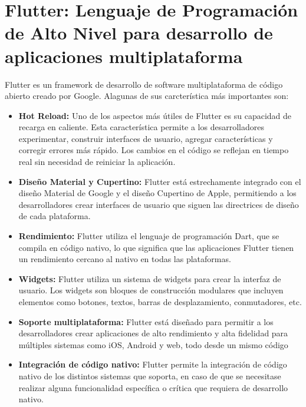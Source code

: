 \section{Flutter: Lenguaje de Programación de Alto Nivel para desarrollo de aplicaciones multiplataforma}
Flutter es un framework de desarrollo de software multiplataforma de código abierto creado por Google. Alagunas de sus carcterística más importantes son:
\begin{itemize}
    \item \textbf{Hot Reload:} Uno de los aspectos más útiles de Flutter es su capacidad de recarga en caliente. Esta característica permite a los desarrolladores experimentar, construir interfaces de usuario, agregar características y corregir errores más rápido. Los cambios en el código se reflejan en tiempo real sin necesidad de reiniciar la aplicación. 
    \item \textbf{Diseño Material y Cupertino:} Flutter está estrechamente integrado con el diseño Material de Google y el diseño Cupertino de Apple, permitiendo a los desarrolladores crear interfaces de usuario que siguen las directrices de diseño de cada plataforma.   
    \item \textbf{Rendimiento:} Flutter utiliza el lenguaje de programación Dart, que se compila en código nativo, lo que significa que las aplicaciones Flutter tienen un rendimiento cercano al nativo en todas las plataformas.    
    \item \textbf{Widgets:} Flutter utiliza un sistema de widgets para crear la interfaz de usuario. Los widgets son bloques de construcción modulares que incluyen elementos como botones, textos, barras de desplazamiento, conmutadores, etc.  
    \item \textbf{Soporte multiplataforma:} Flutter está diseñado para permitir a los desarrolladores crear aplicaciones de alto rendimiento y alta fidelidad para múltiples sistemas como iOS, Android y web, todo desde un mismo código
    \item \textbf{Integración de código nativo:} Flutter permite la integración de código nativo de los distintos sistemas que soporta, en caso de que se necesitase realizar alguna funcionalidad específica o crítica que requiera de desarrollo nativo. 
\end{itemize}
